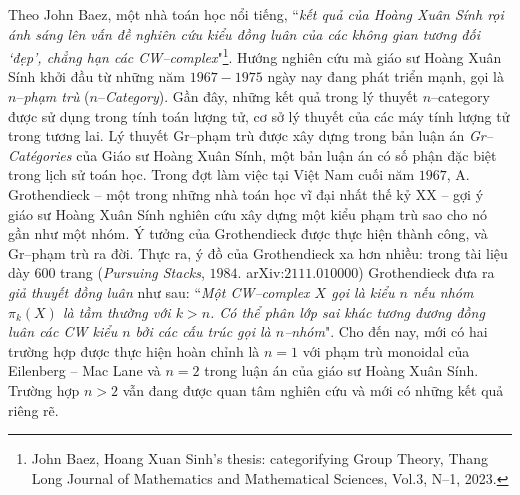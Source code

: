 \begin{multicols}{2}
	\vskip 0.1cm
	Theo John Baez, một nhà toán học nổi tiếng, ``\textit{kết quả của Hoàng Xuân Sính rọi ánh sáng lên vấn đề nghiên cứu kiểu đồng luân của các không gian tương đối `đẹp', chẳng hạn các CW--complex}"\footnote[3]{\color{doisongtoanhoc}John Baez, Hoang Xuan Sinh's thesis: categorifying Group Theory, Thang Long Journal of Mathematics and Mathematical Sciences, Vol.3, N–1, 2023.}.   
	\vskip 0.1cm
	Hướng nghiên cứu mà giáo sư Hoàng Xuân Sính khởi đầu từ những năm $1967-1975$ ngày nay đang phát triển mạnh, gọi là $n$--\textit{phạm trù} ($n$--\textit{Category}). Gần đây, những kết quả trong lý thuyết $n$--category được sử dụng trong tính toán lượng tử, cơ sở lý thuyết của các máy tính lượng tử trong tương lai.
	\vskip 0.1cm
	Lý thuyết Gr--phạm trù được xây dựng trong bản luận án \textit{Gr--Catégories} của Giáo sư Hoàng Xuân Sính, một bản luận án có số phận đặc biệt trong lịch sử toán học. 
	\vskip 0.1cm
	Trong đợt làm việc tại Việt Nam cuối năm $1967$, A. Grothendieck -- một trong những nhà toán học vĩ đại nhất thế kỷ XX -- gợi ý giáo sư Hoàng Xuân Sính nghiên cứu xây dựng một kiểu phạm trù sao cho nó gần như một nhóm. Ý tưởng của Grothendieck được thực hiện thành công, và Gr--phạm trù ra đời. Thực ra, ý đồ của Grothendieck xa hơn nhiều: trong tài liệu dày $600$ trang (\textit{Pursuing Stacks}, $1984$. arXiv:$2111.010000$) Grothendieck đưa ra \textit{giả thuyết đồng luân} như sau: ``\textit{Một CW--complex $X$ gọi là kiểu $n$ nếu nhóm $\pi_k(X)$ là tầm thường với $k > n$. Có thể phân lớp sai khác tương đương đồng luân các CW kiểu $n$ bởi các cấu trúc gọi là $n$--nhóm}". Cho đến nay, mới có hai trường hợp được thực hiện hoàn chỉnh là $n =1$ với phạm trù monoidal của Eilenberg -- Mac Lane và  $n = 2$ trong luận án của giáo sư Hoàng Xuân Sính. Trường hợp $n > 2$ vẫn đang được quan tâm nghiên cứu và mới có những kết quả riêng rẽ.
	\begin{figure}[H]
		\vspace*{-5pt}
		\centering
		\captionsetup{labelformat= empty, justification=centering}

\end{figure}
\end{multicols}
